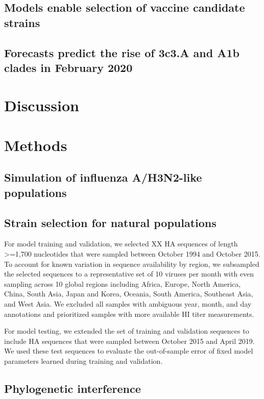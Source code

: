 \subsection*{Models enable selection of vaccine candidate strains}

\subsection*{Forecasts predict the rise of 3c3.A and A1b clades in February 2020}

\section*{Discussion}

\section*{Methods}

\subsection*{Simulation of influenza A/H3N2-like populations}

\subsection*{Strain selection for natural populations}

For model training and validation, we selected XX HA sequences of length >=1,700 nucleotides that were sampled between October 1994 and October 2015.
To account for known variation in sequence availability by region, we subsampled the selected sequences to a representative set of 10 viruses per month with even sampling across 10 global regions including Africa, Europe, North America, China, South Asia, Japan and Korea, Oceania, South America, Southeast Asia, and West Asia.
We excluded all samples with ambiguous year, month, and day annotations and prioritized samples with more available HI titer measurements.

For model testing, we extended the set of training and validation sequences to include HA sequences that were sampled between October 2015 and April 2019.
We used these test sequences to evaluate the out-of-sample error of fixed model parameters learned during training and validation.

\subsection*{Phylogenetic interference}

